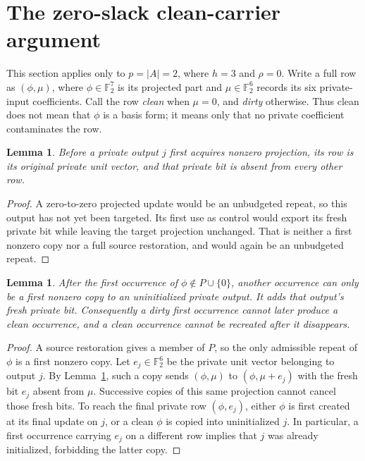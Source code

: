 \documentclass[11pt]{article}
\newtheorem{lemma}[theorem]{Lemma}
\newcommand{\F}{\mathbb F_2}
\begin{document}
\section{The zero-slack clean-carrier argument}
This section applies only to $p=|A|=2$, where $h=3$ and $\rho=0$.
Write a full row as $(\phi,\mu)$, where $\phi\in\F^7$ is its projected part
and $\mu\in\F^6$ records its six private-input coefficients. Call the row
\emph{clean} when $\mu=0$, and \emph{dirty} otherwise. Thus clean does not
mean that $\phi$ is a basis form; it means only that no private coefficient
contaminates the row.
\begin{lemma}\label{lem:fresh}
Before a private output $j$ first acquires nonzero projection, its row
is its original private unit vector, and that private bit is absent
from every other row.
\end{lemma}
\begin{proof}
A zero-to-zero projected update would be an unbudgeted repeat, so this
output has not yet been targeted. Its first use as control would export
its fresh private bit while leaving the target projection unchanged.
That is neither a first nonzero copy nor a full source restoration, and
would again be an unbudgeted repeat.
\end{proof}
\begin{lemma}\label{lem:clean}
After the first occurrence of $\phi\notin P\cup\{0\}$, another occurrence
can only be a first nonzero copy to an uninitialized private output.
It adds that output's fresh private bit. Consequently a dirty first
occurrence cannot later produce a clean occurrence, and a clean occurrence
cannot be recreated after it disappears.
\end{lemma}
\begin{proof}
A source restoration gives a member of $P$, so the only admissible repeat
of $\phi$ is a first nonzero copy. Let $e_j\in\F^6$ be the private unit
vector belonging to output $j$. By Lemma~\ref{lem:fresh}, such a copy sends
$(\phi,\mu)$ to $(\phi,\mu+e_j)$ with the fresh bit $e_j$ absent from $\mu$.
Successive copies of this same projection cannot cancel those fresh bits.
To reach the final private row $(\phi,e_j)$, either $\phi$ is first created
at its final update on $j$, or a clean $\phi$ is copied into uninitialized
$j$. In particular, a first occurrence carrying $e_j$ on a different
row implies that $j$ was already initialized, forbidding the latter copy.
\end{proof}
\end{document}
